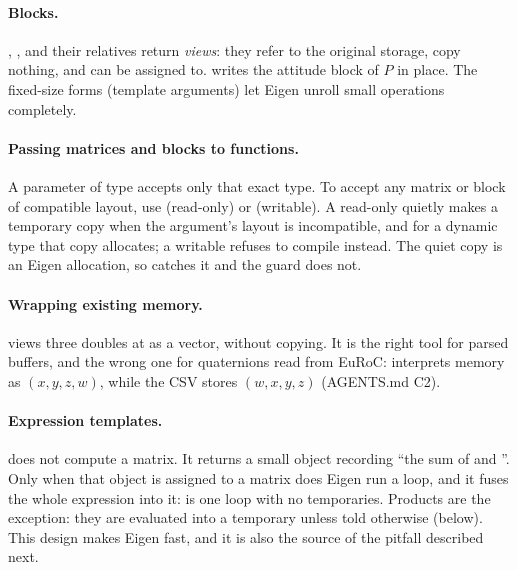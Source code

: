 \paragraph{Blocks.} , ,  and their relatives return \emph{views}: they refer to
the original storage, copy nothing, and can be assigned to.  writes the attitude block of $P$ in place. The fixed-size
forms (template arguments) let Eigen unroll small operations completely.

\paragraph{Passing matrices and blocks to functions.} A parameter of type  accepts only that exact type. To accept any
matrix or block of compatible layout, use  (read-only) or  (writable). A
read-only  quietly makes a temporary copy when the argument's layout is incompatible, and for a dynamic type that copy allocates; a writable
 refuses to compile instead. The quiet copy is an Eigen allocation, so  catches it and the
 guard does not.

\paragraph{Wrapping existing memory.}  views three doubles at  as a vector, without copying.
It is the right tool for parsed buffers, and the wrong one for quaternions read from EuRoC:  interprets memory as
$(x, y, z, w)$, while the CSV stores $(w, x, y, z)$ (AGENTS.md C2).

\paragraph{Expression templates.}  does not compute a matrix. It returns a small object recording ``the sum of  and ''. Only when
that object is assigned to a matrix does Eigen run a loop, and it fuses the whole expression into it:  is one loop with no
temporaries. Products are the exception: they are evaluated into a temporary unless told otherwise (below). This design makes Eigen fast, and it
is also the source of the  pitfall described next.

